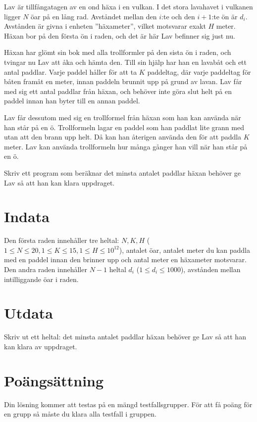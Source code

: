 Lav är tillfångatagen av en ond häxa i en vulkan. I det stora lavahavet i vulkanen ligger $N$ öar på en lång rad.
Avståndet mellan den $i$:te och den $i+1$:te ön är $d_i$. Avstånden är givna i enheten ”häxameter”, vilket motsvarar exakt $H$ meter. Häxan bor på den första ön i raden, och det är här Lav befinner sig just nu.

Häxan har glömt sin bok med alla trollformler på den sista ön i raden, och tvingar nu Lav att åka och hämta den. Till sin hjälp har han en lavabåt och ett antal paddlar. 
Varje paddel håller för att ta $K$ paddeltag, där varje paddeltag för båten framåt en meter, innan paddeln brunnit upp på grund av lavan.
Lav får med sig ett antal paddlar från häxan, och behöver inte göra slut helt på en paddel innan han byter till en annan paddel.

Lav får dessutom med sig en trollformel från häxan som han kan använda när han står på en ö. Trollformeln lagar en paddel som han paddlat lite grann med utan att den brann upp helt.
Då kan han återigen använda den för att paddla $K$ meter. Lav kan använda trollformeln hur många gånger han vill när han står på en ö.

Skriv ett program som beräknar det minsta antalet paddlar häxan behöver ge Lav så att han kan klara uppdraget.

\section*{Indata}
Den första raden innehåller tre heltal: $N, K, H$ ($1 \leq N \leq 20, 1 \leq K \leq 15, 1 \leq H \leq 10^{12}$), antalet öar, antalet meter du kan paddla med en paddel innan den brinner upp och antal meter en häxameter motsvarar.
Den andra raden innehåller $N-1$ heltal $d_i$ ($1 \leq d_i \leq 1000$), avstånden mellan intilliggande öar i raden.

\section*{Utdata}
Skriv ut ett heltal: det minsta antalet paddlar häxan behöver ge Lav så att han kan klara av uppdraget.

\section*{Poängsättning}
Din lösning kommer att testas på en mängd testfallsgrupper.
För att få poäng för en grupp så måste du klara alla testfall i gruppen.

